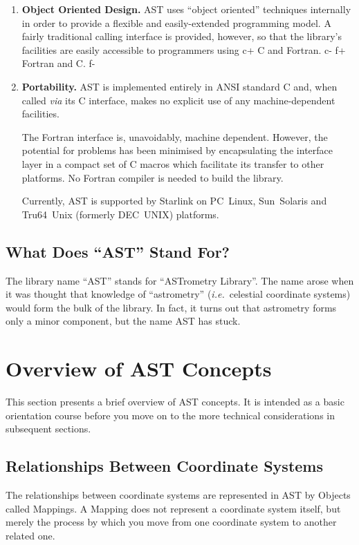 \documentclass[twoside,11pt]{article}
\begin{document}
\begin{enumerate}
\item {\bf{Ob\mbox{}ject Oriented Design.}}
AST uses ``object oriented'' techniques internally in order to provide
a flexible and easily-extended programming model.  A fairly
traditional calling interface is provided, however, so that the
library's facilities are easily accessible to programmers using
c+
C and Fortran.
c-
f+
Fortran and C.
f-

\item {\bf{Portability.}}
AST is implemented entirely in ANSI standard C and, when called
{\em{via}} its C interface, makes no explicit use of any
machine-dependent facilities.

The Fortran interface is, unavoidably, machine dependent. However, the
potential for problems has been minimised by encapsulating the
interface layer in a compact set of C macros which facilitate its
transfer to other platforms. No Fortran compiler is needed to build
the library.

Currently, AST is supported by Starlink on PC~Linux, Sun~Solaris and
Tru64~Unix (formerly DEC~UNIX) platforms.
\end{enumerate}

\subsection{What Does ``AST'' Stand For?}

The library name ``AST'' stands for ``ASTrometry Library''. The name
arose when it was thought that knowledge of ``astrometry''
({\em{i.e.}}\ celestial coordinate systems) would form the bulk of the
library.  In fact, it turns out that astrometry forms only a minor
component, but the name AST has stuck.

\cleardoublepage
\section{Overview of AST Concepts}

This section presents a brief overview of AST concepts. It is intended
as a basic orientation course before you move on to the more technical
considerations in subsequent sections.

\subsection{\label{ss:mappingoverview}Relationships Between Coordinate Systems}

The relationships between coordinate systems are represented in AST by
Objects called Mappings. A Mapping does not represent a coordinate
system itself, but merely the process by which you move from one
coordinate system to another related one.
 
\end{document}
